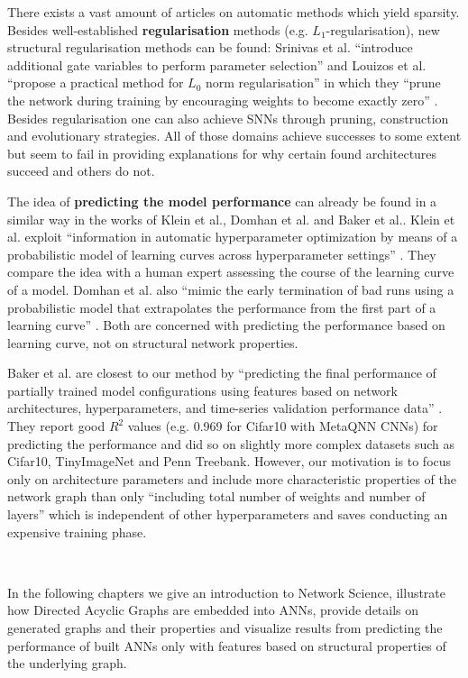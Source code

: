 \documentclass[runningheads]{llncs}
\begin{document}
There exists a vast amount of articles on automatic methods which yield sparsity.
Besides well-established \textbf{regularisation} methods (e.g. $L_1$-regularisation), new structural regularisation methods can be found:
Srinivas et al. ``introduce additional gate variables to perform parameter selection'' \cite{srinivas2017training} and Louizos et al. ``propose a practical method for $L_0$ norm regularisation'' in which they ``prune the network during training by encouraging weights to become exactly zero'' \cite{louizos2017learning}.
Besides regularisation one can also achieve SNNs through pruning, construction and evolutionary strategies.
All of those domains achieve successes to some extent but seem to fail in providing explanations for why certain found architectures succeed and others do not.

The idea of \textbf{predicting the model performance} can already be found in a similar way in the works of Klein et al., Domhan et al. and Baker et al..
Klein et al. exploit ``information in automatic hyperparameter optimization by means of a probabilistic model of learning curves across hyperparameter settings'' \cite{klein2016learning}.
They compare the idea with a human expert assessing the course of the learning curve of a model.
Domhan et al. also ``mimic the early termination of bad runs using a probabilistic model that extrapolates the performance from the first part of a learning curve'' \cite{domhan2015speeding}.
Both are concerned with predicting the performance based on learning curve, not on structural network properties.

Baker et al. are closest to our method by ``predicting the final performance of partially trained model configurations using features based on network architectures, hyperparameters, and time-series validation performance data'' \cite{baker2018accelerating}.
They report good $R^2$ values (e.g. 0.969 for Cifar10 with MetaQNN CNNs) for predicting the performance and did so on slightly more complex datasets such as Cifar10, TinyImageNet and Penn Treebank.
However, our motivation is to focus only on architecture parameters and include more characteristic properties of the network graph than only ``including total number of weights and number of layers'' which is independent of other hyperparameters and saves conducting an expensive training phase.

~

\noindent In the following chapters we give an introduction to Network Science, illustrate how Directed Acyclic Graphs are embedded into ANNs, provide details on generated graphs and their properties and visualize results from predicting the performance of built ANNs only with features based on structural properties of the underlying graph.
\end{document}
